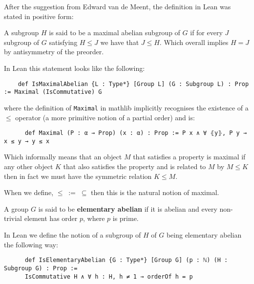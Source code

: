 \begin{remark}
After the suggestion from Edward van de Meent, the definition in Lean was stated in positive form:

A subgroup $H$ is said to be a maximal abelian subgroup of $G$ if for every $J$ subgroup of $G$ satisfying $H \le J$ we have that $J \le H$. Which overall implies $H = J$ by antisymmetry of the preorder.

In Lean this statement looks like the following:

\begin{footnotesize}
  \begin{verbatim}
    def IsMaximalAbelian {L : Type*} [Group L] (G : Subgroup L) : Prop := Maximal (IsCommutative) G
  \end{verbatim}
\end{footnotesize}


  where the definition of \texttt{Maximal} in mathlib implicitly recognises the existence of a $\le$ operator (a more primitive notion of a partial order) and is:

  \begin{footnotesize}
    \begin{verbatim}
      def Maximal (P : α → Prop) (x : α) : Prop := P x ∧ ∀ ⦃y⦄, P y → x ≤ y → y ≤ x
    \end{verbatim}
  \end{footnotesize}
  

  Which informally means that an object $M$ that satisfies a property is maximal if any other object $K$ that also satisfies the property and is related to $M$ by $M \le K$ then in fact we must have the symmetric relation $K \le M$.

  When we define, $\le \; := \;  \subseteq$ then this is the natural notion of maximal.
\end{remark}


\begin{definition}
\label{IsElementaryAbelian}
\leanok
A group $G$ is said to be \textbf{elementary abelian} if it is abelian and every non-trivial element has order $p$, where $p$ is prime.
\end{definition}

\begin{remark}
  In Lean we define the notion of a subgroup of $H$ of $G$ being elementary abelian the following way:
  \begin{footnotesize}
  \begin{verbatim}
      def IsElementaryAbelian {G : Type*} [Group G] (p : ℕ) (H : Subgroup G) : Prop :=
      IsCommutative H ∧ ∀ h : H, h ≠ 1 → orderOf h = p
  \end{verbatim}
  \end{footnotesize}
 
\end{remark}

